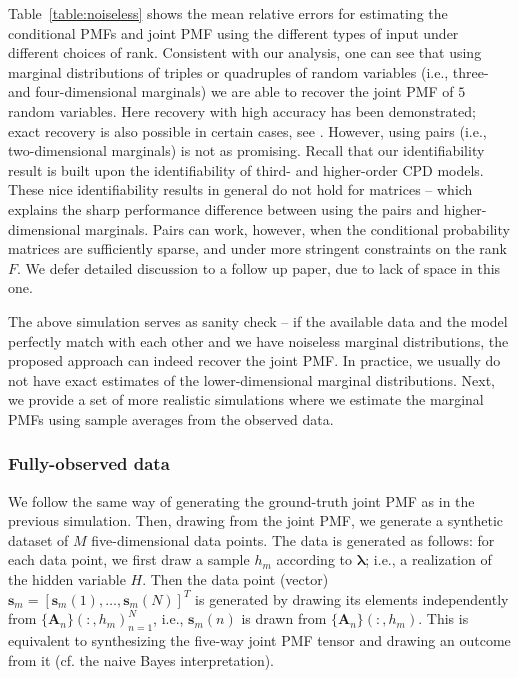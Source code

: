 \documentclass[journal]{IEEEtran}
\begin{document}
Table~\ref{table:noiseless} shows the mean relative errors for estimating the conditional PMFs and joint PMF using the different types of input under different choices of rank. Consistent with our analysis, one can see that using marginal distributions of triples or quadruples of random variables (i.e.,  {three- and four-dimensional} marginals) we are able to recover the joint PMF of $5$ random variables. Here recovery with high accuracy has been demonstrated; exact recovery is also possible in certain cases, see \cite{SiDeFu2017}. However, using pairs (i.e.,  {two-dimensional} marginals) is not as promising. Recall that our identifiability result is built upon the identifiability of third- and higher-order CPD models. These nice identifiability results in general do not hold for matrices -- which explains the sharp performance difference between using the pairs and  {higher-dimensional} marginals. Pairs can work, however, when the conditional probability matrices are sufficiently sparse, and under more stringent constraints on the rank $F$. We defer detailed discussion to a follow up paper, due to lack of space in this one. 
 
The above simulation serves as sanity check -- if the available data and the model perfectly match with each other and we have noiseless marginal distributions, the proposed approach can indeed recover the joint PMF.
In practice, we usually do not have exact estimates of the  {lower-dimensional} marginal distributions.
Next, we provide a set of more realistic simulations where we estimate the marginal PMFs using sample averages from the observed data. 



\subsubsection{Fully-observed data}

We follow the same way of generating the ground-truth joint PMF as in the previous simulation. Then, drawing from the joint PMF, we generate a synthetic dataset of $M$  {five-dimensional} data points. The data is generated as follows: for each data point, we first draw a sample $h_m$ according to $\boldsymbol{\lambda}$; i.e., a realization of the hidden variable $H$. Then the data point (vector)  { $\mathbf{s}_m = [\mathbf{s}_m(1),\ldots,\mathbf{s}_m(N)]^T$} is generated by drawing its elements independently from $\{\mathbf{A}_n\}(:,h_m)_{n=1}^N$, i.e., $\mathbf{s}_m(n)$ is drawn from $\{\mathbf{A}_n\}(:,h_m)$. This is equivalent to synthesizing the  {five-way} joint PMF tensor and drawing an outcome from it (cf. the naive Bayes interpretation). 
\end{document}
